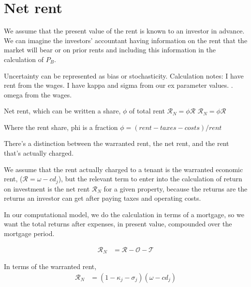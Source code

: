 \section{Net rent}\label{SS:NetRent}
We assume that the present value of the rent %
is known to an investor in advance. We can imagine the investors' accountant having information on the rent that the market will bear or on prior rents and including this information in the calculation of $P_B$.

Uncertainty can be represented as bias or stochasticity.
Calculation notes: I have rent from the wages. I have kappa and sigma from our ex parameter values. . omega from the wages. 

Net rent, which can be written a share, $\phi$ of total rent $\mathcal{R}_N = \phi \mathcal{R}$
$\mathcal{R}_N = \phi \mathcal{R}$

Where the \gls{rent share}, phi is a fraction
$\phi = (rent-taxes-costs) /rent$ 

There's a distinction between the warranted rent, the net rent, and the rent that's actually charged.

We assume that the  rent  actually charged to a tenant is the warranted economic rent, ($\mathcal{R}= \omega - {c} d_j$), but the relevant term to enter into the calculation of return on investment is the net rent $\mathcal{R}_N$ for a given property, because the returns are the returns an investor can get after paying taxes and operating costs.

In our computational model, we do the calculation in terms of a mortgage, so we want the total returns after expenses, in present value, compounded over the mortgage  period.

\begin{align}
\mathcal{R}_N &= \mathcal{R} - \mathcal{O} - \mathcal{T} 
\end{align}

In terms of the warranted rent, 
\begin{align}
\mathcal{R}_N &= (1-\kappa_j - \sigma_j)(\omega - {c} d_j)
\end{align}




